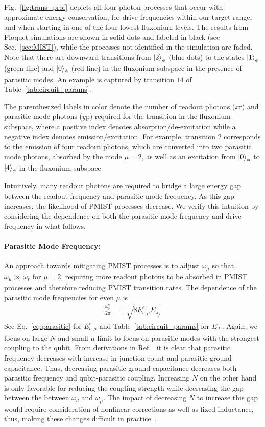 \documentclass[%
reprint,
superscriptaddress,
 amsmath,amssymb,
 aps,
 prx,
longbibliography,
floatfix,
]{revtex4-2}
\begin{document}
Fig.~\ref{fig:trans_prof} depicts all four-photon processes that occur with approximate energy conservation, for drive frequencies within our target range, and when starting in one of the four lowest fluxonium levels. The results from Floquet simulations are  shown in solid dots and labeled in black (see Sec.~\ref{sec:MIST}), while the processes not identified in the simulation are faded. Note that there are downward transitions from $\ket{2}_\phi$ (blue dots) to the states $\ket{1}_\phi$ (green line) and $\ket{0}_\phi$ (red line) in the fluxonium subspace in the presence of parasitic modes. An example is captured by transition $14$ of Table~\ref{tab:circuit_params}. 

The parenthesized labels in color denote the number of readout photons ($x \mathrm{r}$) and parasitic mode photons ($y\mathrm{p}$) required for the transition in the fluxonium subspace, where a positive index denotes absorption/de-excitation while a negative index denotes emission/excitation. For example, transition $2$ corresponds to the emission of four readout photons, which are converted into two parasitic mode photons, absorbed by the mode $\mu=2$, as well as an excitation from $\ket{0}_\phi$ to $\ket{4}_\phi$ in the fluxonium subspace. 

Intuitively, many readout photons are required to bridge a large energy gap between the readout frequency and parasitic mode frequency. As this gap increases, the likelihood of PMIST processes decrease. We verify this intuition
by considering the dependence on both the parasitic mode frequency and drive frequency in what follows.  


\paragraph{Parasitic Mode Frequency:}
An approach towards mitigating PMIST processes is to adjust $\omega_\mu$ so that $\omega_\mu \gg\omega_r$ for $\mu=2$, requiring more readout photons to be absorbed in PMIST processes and therefore reducing PMIST transition rates. The dependence of the parasitic mode frequencies for even $\mu$ is
\begin{align}
    \frac{\omega_\mu^e}{2\pi}&=\sqrt{8E_{c,\mu}^e E_{J_j}}
\end{align}
 See Eq.~\ref{eq:parasitic} for $E_{c,\mu}^e$ and Table~\ref{tab:circuit_params} for $E_{J_j}$. Again, we focus on large $N$ and small $\mu$ limit to focus on parasitic modes with the strongest coupling to the qubit. From derivations in Ref.~\cite{viola2015collective} it is clear that parasitic frequency decreases with increase in junction count and 
 parasitic ground capacitance. Thus, decreasing parasitic ground capacitance decreases both parasitic frequency and qubit-parasitic coupling. Increasing $N$ on the other hand is only favorable for reducing the coupling strength while decreasing the gap between the between $\omega_d$ and $\omega_\mu$. The impact of decreasing $N$ to increase this gap would require consideration of nonlinear corrections as well as fixed inductance, thus, making these changes difficult in practice~\cite{viola2015collective}. 
\end{document}
